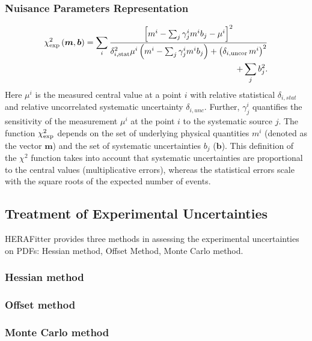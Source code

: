 \subsubsection{Nuisance Parameters Representation}

%
\begin{align} 
    \chi^2_{\rm exp}\left(\boldsymbol{m},\boldsymbol{b}\right) =  
 \sum_i \frac{\left[m^i - \sum_j \gamma^i_j m^i b_j  - {\mu^i} \right]^2}
{ \textstyle \delta^2_{i,{\rm stat}}\mu^i \left(m^i -  \sum_j \gamma^i_j m^i b_j\right)
  + \left(\delta_{i,{\rm uncor}}\,  m^i\right)^2} \nonumber \\
  + \sum_j b^2_j.
\label{eq:aven}
\end{align}
%
Here ${\mu^i}$ is the  measured central value  at a point $i$ 
with  relative statistical $\delta_{i,stat}$ 
and relative uncorrelated systematic uncertainty $\delta_{i,unc}$.
Further, 
$\gamma^i_j$ 
quantifies the sensitivity of the
measurement ${\mu^i}$ at the point $i$ to the systematic source $j$. 
The function $\chi^2_{\rm exp}$ depends on the set of
underlying physical quantities $m^i$ 
(denoted as the vector $\boldsymbol{m}$) and 
 the set of systematic uncertainties $b_j$ ($\boldsymbol{b}$).
This definition of the $\chi^2$ function takes into account that
systematic uncertainties are proportional to the central values 
(multiplicative errors), whereas the statistical errors scale 
with the square roots of the expected number of events. 


\subsection{Treatment of Experimental Uncertainties}

HERAFitter provides three methods in assessing the experimental uncertainties on PDFs: Hessian method, Offset Method, Monte Carlo method.

\subsubsection{Hessian method}
\subsubsection{Offset  method}
\subsubsection{Monte Carlo method}



